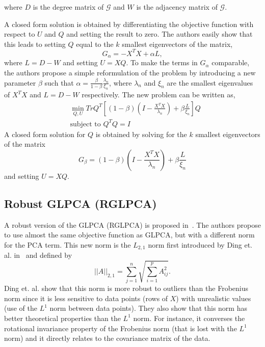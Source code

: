 \documentclass[sigconf]{acmart}
\begin{document}
where $D$ is the degree matrix of $\mathcal{G}$ and $W$ is the adjacency matrix of $\mathcal{G}$.

A closed form solution is obtained by differentiating the objective function with respect to $U$ and $Q$ and setting the result to zero. The authors easily show that this leads to setting $Q$ equal to the $k$ smallest eigenvectors of the matrix,
$$ G_\alpha = -X^TX + \alpha L,$$
where $L = D-W$ and setting $U = XQ$.
To make the terms in $G_\alpha$ comparable, the authors propose
a simple reformulation of the problem by introducing a new parameter $\beta$ such that $\alpha = \frac{\beta}{1-\beta}\frac{\lambda_n}{\xi_n}$, where $\lambda_n$ and $\xi_n$ are the smallest eigenvalues of $X^TX$ and $L = D-W$ respectively. The new problem can be written as,
\begin{align*}
    & \min_{Q, U} TrQ^T\left[(1-\beta)(I - \frac{X^TX}{\lambda_n}) + \beta \frac{L}{\xi_n}\right]Q \\
    & \text{subject to } Q^TQ = I
\end{align*}
A closed form solution for $Q$ is obtained by solving for the $k$ smallest eigenvectors of the matrix
$$ G_\beta = (1-\beta)(I - \frac{X^TX}{\lambda_n}) + \beta \frac{L}{\xi_n}$$
and setting $U = XQ$.
\subsection{Robust GLPCA (RGLPCA)}

A robust version of the GLPCA (RGLPCA) is proposed in~\cite{rglpca_paper}. The authors propose to use almost the same objective function as GLPCA, but with a different norm for the PCA term. This new norm is the $L_{2, 1}$ norm first introduced by Ding et. al. in~\cite{L21_norm} and defined by $$ ||A||_{2, 1} = \displaystyle \sum\limits_{j=1}^n \sqrt{\sum \limits_{i=1}^p A_{ij}^2}.$$
Ding et. al. show that this norm is more robust to outliers than the Frobenius norm since it is less sensitive to data points (rows of $X$) with unrealistic values (use of the $L^1$ norm between data points). They also show that this norm has better theoretical properties than the $L^1$ norm. For instance, it converses the rotational invariance property of the Frobenius norm (that is lost with the $L^1$ norm) and it directly relates to the covariance matrix of the data.
\end{document}
